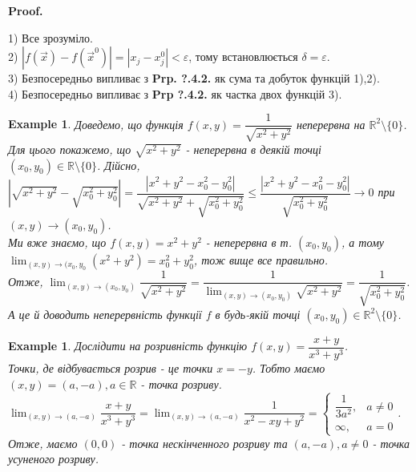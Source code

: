 \documentclass[a4paper, 10pt]{article}
\makeatletter
\def\qed{$\blacksquare$}
\theoremstyle{theoremdd}
\theoremstyle{theoremdd}
\theoremstyle{theoremdd}
\theoremstyle{theoremdd}
\theoremstyle{theoremdd}
\newtheorem{example}[theorem]{Example}
\theoremstyle{theoremdd}
\theoremstyle{theoremdd}
\theoremstyle{theoremdd}
\theoremstyle{theoremdd}
\renewenvironment{proof}[1][Proof.\\]{\par
\pushQED{\hfill \qed}%
\normalfont \topsep6\p@\@plus6\p@\relax
\trivlist
\item\relax
{\bfseries
#1\@addpunct{.}}\hspace\labelsep\ignorespaces
}{%
\popQED\endtrivlist\@endpefalse
}
\makeatother
\begin{document}
\begin{proof}
1) Все зрозуміло.
\bigskip \\
2) $|f(\vec{x}) - f(\vec{x}^0)| = |x_j - x_j^0| < \varepsilon$, тому встановлюється $\delta = \varepsilon$.
\bigskip \\
3) Безпосередньо випливає з \textbf{Prp. ?.4.2.} як сума та добуток функцій 1),2).
\bigskip \\
4) Безпосередньо випливає з \textbf{Prp ?.4.2.} як частка двох функцій 3).
\end{proof}

\begin{example}
Доведемо, що функція $f(x,y) = \dfrac{1}{\sqrt{x^2+y^2}}$ неперервна на $\mathbb{R}^2 \setminus \{0\}$.\\
Для цього покажемо, що $\sqrt{x^2+y^2}$ - неперервна в деякій точці $(x_0,y_0) \in \mathbb{R} \setminus \{0\}$. Дійсно,\\
$|\sqrt{x^2+y^2} - \sqrt{x_0^2+y_0^2}| = \dfrac{|x^2+y^2-x_0^2-y_0^2|}{\sqrt{x^2+y^2} + \sqrt{x_0^2+y_0^2}} \leq \dfrac{|x^2+y^2-x_0^2-y_0^2|}{\sqrt{x_0^2+y_0^2}} \to 0$ при $(x,y) \to (x_0,y_0)$.\\
Ми вже знаємо, що $f(x,y) = x^2+y^2$ - неперервна в т. $(x_0,y_0)$, а тому $\displaystyle\lim_{(x,y) \to (x_0,y_0} (x^2+y^2) = x_0^2 + y_0^2$, тож вище все правильно.\\
Отже, $\displaystyle\lim_{(x,y) \to (x_0,y_0)} \dfrac{1}{\sqrt{x^2+y^2}} = \dfrac{1}{\displaystyle\lim_{(x,y) \to (x_0,y_0)} \sqrt{x^2+y^2}} = \dfrac{1}{\sqrt{x_0^2+y_0^2}}$.\\
А це й доводить неперервність функції $f$ в будь-якій точці $(x_0,y_0) \in \mathbb{R}^2 \setminus \{0\}$. 
\end{example}

\begin{example}
Дослідити на розривність функцію $f(x,y) = \dfrac{x+y}{x^3+y^3}$.\\
Точки, де відбувається розрив - це точки $x = -y$. Тобто маємо $(x,y) = (a,-a), a \in \mathbb{R}$ - точка розриву.\\
$\displaystyle\lim_{(x,y) \to (a,-a)} \dfrac{x+y}{x^3+y^3} = \lim_{(x,y) \to (a,-a)} \dfrac{1}{x^2-xy+y^2} = \begin{cases} \dfrac{1}{3a^2}, & a \neq 0 \\ \infty, & a = 0 \end{cases} $.\\
Отже, маємо $(0,0)$ - точка нескінченного розриву та $(a,-a), a \neq 0$ - точка усуненого розриву.
\end{example}
\end{document}
